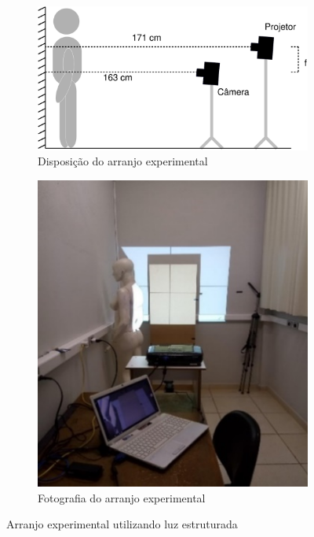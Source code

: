 \documentclass[a4paper, 12pt]{article}
\begin{document}
\begin{figure}[H]
\centering
    \begin{subfigure}{.695\textwidth}
      \centering
      \includegraphics[width=.95\linewidth]{configuracao_sistema_1.eps}  
      \caption{Disposição do arranjo experimental}
      \label{arranjo-experimetal:1}
    \end{subfigure}
    \begin{subfigure}{.295\textwidth}
      \centering
      \includegraphics[width=.95\linewidth]{configuracao_sistema_2.png}
      \caption{Fotografia do arranjo experimental}
      \label{arranjo-experimetal:2}
    \end{subfigure}	
\caption{Arranjo experimental utilizando luz estruturada}
\label{arranjo-experimetal}
\end{figure}
\end{document}
